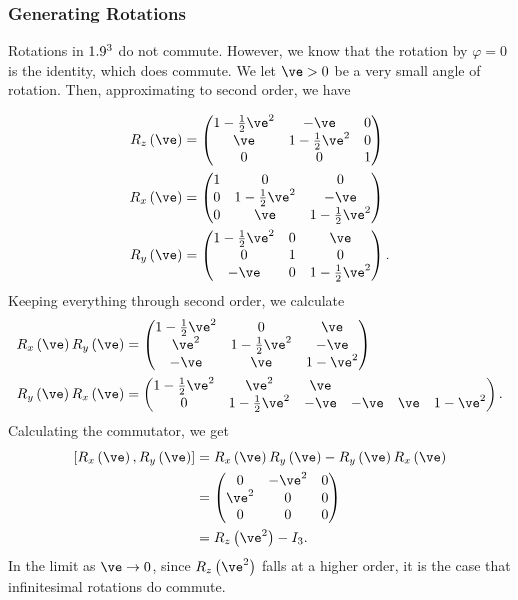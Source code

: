 \documentclass[10pt]{mypackage}
\begin{document}
\subsubsection{Generating Rotations}%
Rotations in $1.9^3$ do not commute. However, we know that the rotation by $\varphi = 0$ is the identity, which does commute. We let $\ve > 0$ be a very small angle of rotation. Then, approximating to second order, we have
{\renewcommand{\arraystretch}{1.5}
\begin{align*}
  R_z\left(\ve\right) &= \begin{pmatrix}1-\frac{1}{2}\ve^2 & -\ve & 0 \\ \ve & 1-\frac{1}{2}\ve^2 & 0 \\ 0 & 0 & 1\end{pmatrix}\\
  R_x\left(\ve\right) &= \begin{pmatrix}1 & 0 & 0 \\ 0 & 1-\frac{1}{2}\ve^2 & -\ve \\ 0 & \ve & 1-\frac{1}{2}\ve^2\end{pmatrix}\\
  R_y\left(\ve\right) &= \begin{pmatrix}1-\frac{1}{2}\ve^2 & 0 & \ve \\ 0 & 1 & 0 \\ -\ve & 0 & 1-\frac{1}{2}\ve^2\end{pmatrix}.
\end{align*}
Keeping everything through second order, we calculate
\begin{align*}
  R_x\left(\ve\right)R_y\left(\ve\right) &= \begin{pmatrix}1-\frac{1}{2}\ve^2 & 0 & \ve \\ \ve^2 & 1-\frac{1}{2}\ve^2 & -\ve \\ -\ve & \ve & 1-\ve^2\end{pmatrix}\\
  R_y\left(\ve\right)R_x\left(\ve\right) &= \begin{pmatrix}1-\frac{1}{2}\ve^2 & \ve^2 & \ve \\ 0 & 1-\frac{1}{2}\ve^2 & -\ve & -\ve & \ve & 1-\ve^2\end{pmatrix}.
\end{align*}
Calculating the commutator, we get
\begin{align*}
  \left[R_x\left(\ve\right),R_y\left(\ve\right)\right] &= R_x\left(\ve\right)R_y\left(\ve\right) - R_y\left(\ve\right)R_x\left(\ve\right)\\
                                                       &= \begin{pmatrix}0 & -\ve^2 & 0 \\ \ve^2 & 0 & 0 \\ 0 & 0 & 0\end{pmatrix}\\
                                                       &= R_z\left(\ve^2\right) - I_{3}.
\end{align*}
In the limit as $\ve \rightarrow 0$, since $R_z\left(\ve^2\right)$ falls at a higher order, it is the case that infinitesimal rotations do commute.\newline

}
\end{document}
